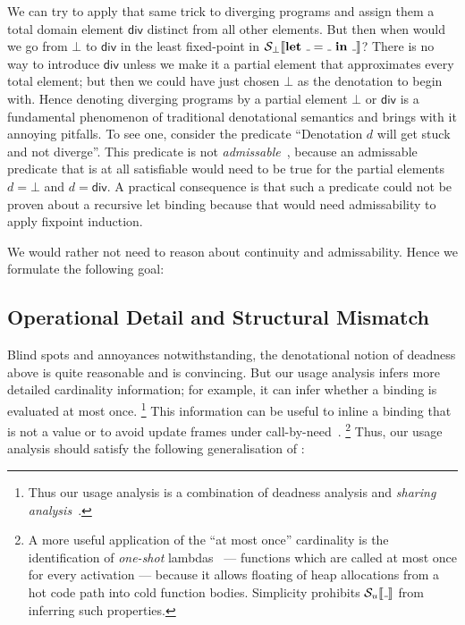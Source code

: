 We can try to apply that same trick to diverging programs and assign them a
total domain element $\mathsf{div}$ distinct from all other elements.
But then when would we go from $\bot$ to $\mathsf{div}$ in the least fixed-point in
$\semscott{\Let{\wild}{\wild}{\wild}}$?
There is no way to introduce $\mathsf{div}$ unless we make it a partial element
that approximates every total element; but then we could have just chosen $\bot$
as the denotation to begin with.
Hence denoting diverging programs by a partial element $\bot$ or $\mathsf{div}$
is a fundamental phenomenon of traditional denotational semantics and brings
with it annoying pitfalls.
To see one, consider the predicate ``Denotation $d$ will get stuck and not
diverge''.
This predicate is not \emph{admissable}~\citep{Abramsky:94}, because an
admissable predicate that is at all satisfiable would need to be true for
the partial elements $d=\bot$ and $d=\mathsf{div}$.
A practical consequence is that such a predicate could not be proven about a
recursive let binding because that would need admissability to apply fixpoint
induction.  

We would rather not need to reason about continuity and admissability.
Hence we formulate the following goal:


\subsection{Operational Detail and Structural Mismatch}

Blind spots and annoyances notwithstanding, the denotational notion of deadness
above is quite reasonable and  is convincing.
But our usage analysis infers more detailed cardinality information;
for example, it can infer whether a binding is evaluated at most once.%
\footnote{Thus our usage analysis is a combination of deadness analysis
and \emph{sharing analysis}~\citep{Gustavsson:98}.}
This information can be useful to inline a binding that is not a value or
to avoid update frames under call-by-need~\citep{Gustavsson:98,cardinality-ext}.%
\footnote{A more useful application of the ``at most once'' cardinality is the
identification of \emph{one-shot} lambdas~\citep{cardinality-ext} --- functions which are
called at most once for every activation --- because it allows floating of heap
allocations from a hot code path into cold function bodies.
Simplicity prohibits $\semusg{\wild}$ from inferring such properties.}
Thus, our usage analysis should satisfy the following generalisation of
:

